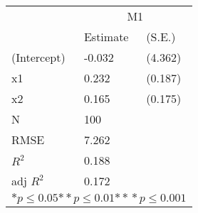 \begin{tabular}{*{3}{l}}
\hline
                  & \multicolumn{2}{c}{M1}   \tabularnewline
                   &Estimate  &(S.E.)  \tabularnewline
 \hline
 \hline
   (Intercept)     &-0.032   &   (4.362) \tabularnewline
   x1              &0.232   &   (0.187) \tabularnewline
   x2              &0.165   &   (0.175) \tabularnewline
 \hline
 N                 &100       &        \tabularnewline
 RMSE             &7.262         & \tabularnewline
 $R^2$             &0.188         & \tabularnewline
 adj $R^2$         &0.172         & \tabularnewline
 \hline
\hline
 
 \multicolumn{3}{c}{${*  p}\le 0.05$${*\!\!*  p}\le 0.01$${*\!\!*\!\!*  p}\le 0.001$}\tabularnewline
 \end{tabular}